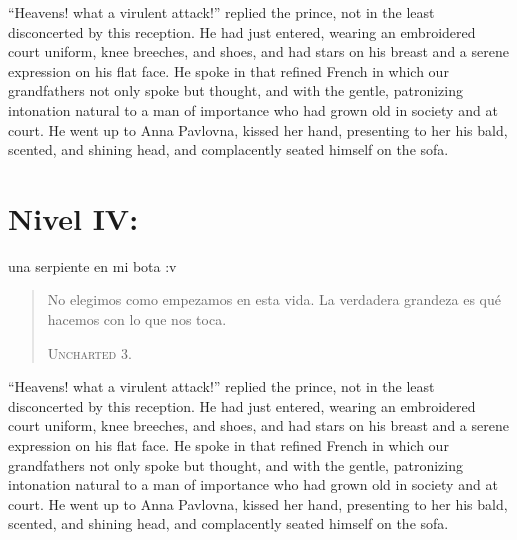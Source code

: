 ``Heavens! what a virulent attack!'' replied the prince, not in
the least disconcerted by this reception. He had just entered,
wearing an embroidered court uniform, knee breeches, and shoes,
and had stars on his breast and a serene expression on his flat
face. He spoke in that refined French in which our grandfathers
not only spoke but thought, and with the gentle, patronizing
intonation natural to a man of importance who had grown old in
society and at court. He went up to Anna Pavlovna, kissed her
hand, presenting to her his bald, scented, and shining head, and
complacently seated himself on the sofa.



\chapter*{Nivel IV: } 

 una serpiente en mi bota :v 

\begin{quote} \calli No elegimos como empezamos en esta vida. La verdadera grandeza es qué hacemos con lo que nos toca. 

\textsc{Uncharted 3.}
\end{quote}

``Heavens! what a virulent attack!'' replied the prince, not in
the least disconcerted by this reception. He had just entered,
wearing an embroidered court uniform, knee breeches, and shoes,
and had stars on his breast and a serene expression on his flat
face. He spoke in that refined French in which our grandfathers
not only spoke but thought, and with the gentle, patronizing
intonation natural to a man of importance who had grown old in
society and at court. He went up to Anna Pavlovna, kissed her
hand, presenting to her his bald, scented, and shining head, and
complacently seated himself on the sofa.



